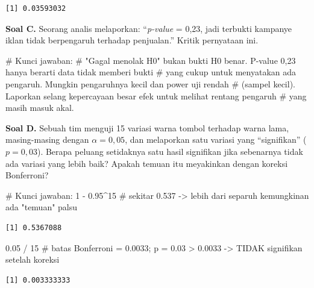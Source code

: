 \documentclass[
  indonesian,
  letterpaper,
]{book}
\newenvironment{Shaded}{\begin{snugshade}}{\end{snugshade}}
\newcommand{\CommentTok}[1]{\textcolor[rgb]{0.37,0.37,0.37}{#1}}
\newcommand{\DecValTok}[1]{\textcolor[rgb]{0.68,0.00,0.00}{#1}}
\newcommand{\FloatTok}[1]{\textcolor[rgb]{0.68,0.00,0.00}{#1}}
\newcommand{\SpecialCharTok}[1]{\textcolor[rgb]{0.37,0.37,0.37}{#1}}
\begin{document}
\begin{verbatim}
[1] 0.03593032
\end{verbatim}

\textbf{Soal C.} Seorang analis melaporkan: ``\emph{p-value} = 0,23,
jadi terbukti kampanye iklan tidak berpengaruh terhadap penjualan.''
Kritik pernyataan ini.

\begin{Shaded}
\begin{Highlighting}[]
\CommentTok{\# Kunci jawaban:}
\CommentTok{\# "Gagal menolak H0" bukan bukti H0 benar. P{-}value 0,23 hanya berarti data tidak memberi bukti}
\CommentTok{\# yang cukup untuk menyatakan ada pengaruh. Mungkin pengaruhnya kecil dan power uji rendah}
\CommentTok{\# (sampel kecil). Laporkan selang kepercayaan besar efek untuk melihat rentang pengaruh}
\CommentTok{\# yang masih masuk akal.}
\end{Highlighting}
\end{Shaded}

\textbf{Soal D.} Sebuah tim menguji 15 variasi warna tombol terhadap
warna lama, masing-masing dengan \(\alpha = 0{,}05\), dan melaporkan
satu variasi yang ``signifikan'' (\(p = 0{,}03\)). Berapa peluang
setidaknya satu hasil signifikan jika sebenarnya tidak ada variasi yang
lebih baik? Apakah temuan itu meyakinkan dengan koreksi Bonferroni?

\begin{Shaded}
\begin{Highlighting}[]
\CommentTok{\# Kunci jawaban:}
\DecValTok{1} \SpecialCharTok{{-}} \FloatTok{0.95}\SpecialCharTok{\^{}}\DecValTok{15}   \CommentTok{\# sekitar 0.537 {-}\textgreater{} lebih dari separuh kemungkinan ada "temuan" palsu}
\end{Highlighting}
\end{Shaded}

\begin{verbatim}
[1] 0.5367088
\end{verbatim}

\begin{Shaded}
\begin{Highlighting}[]
\FloatTok{0.05} \SpecialCharTok{/} \DecValTok{15}     \CommentTok{\# batas Bonferroni = 0.0033; p = 0.03 \textgreater{} 0.0033 {-}\textgreater{} TIDAK signifikan setelah koreksi}
\end{Highlighting}
\end{Shaded}

\begin{verbatim}
[1] 0.003333333
\end{verbatim}
\end{document}
